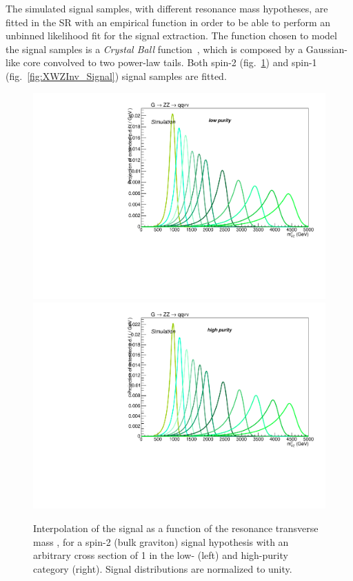 The simulated signal samples, with different resonance mass hypotheses, are fitted in the SR with an empirical function in order to be able to perform an unbinned likelihood fit for the signal extraction. The function chosen to model the signal samples is a \emph{Crystal Ball} function~\cite{Oreglia:1980cs,Skwarnicki:1986xj}, which is composed by a Gaussian-like core convolved to two power-law tails. %
Both spin-2 (fig.~\ref{fig:XZZInv_Signal}) and spin-1 (fig.~\ref{fig:XWZInv_Signal}) signal samples are fitted.

\begin{figure}[!htb]
  \centering
    \includegraphics[width=.495\textwidth]{plotsAlpha_tesi/XVZnnlp/XZZInv_Signal.pdf}
    \includegraphics[width=.495\textwidth]{plotsAlpha_tesi/XVZnnhp/XZZInv_Signal.pdf}
  \caption{Interpolation of the signal as a function of the resonance transverse mass \mtVZ, for a spin-2 (bulk graviton) signal hypothesis with an arbitrary cross section of 1 \pb in the low- (left) and high-purity category (right). Signal distributions are normalized to unity.}
  \label{fig:XZZInv_Signal}
\end{figure}

